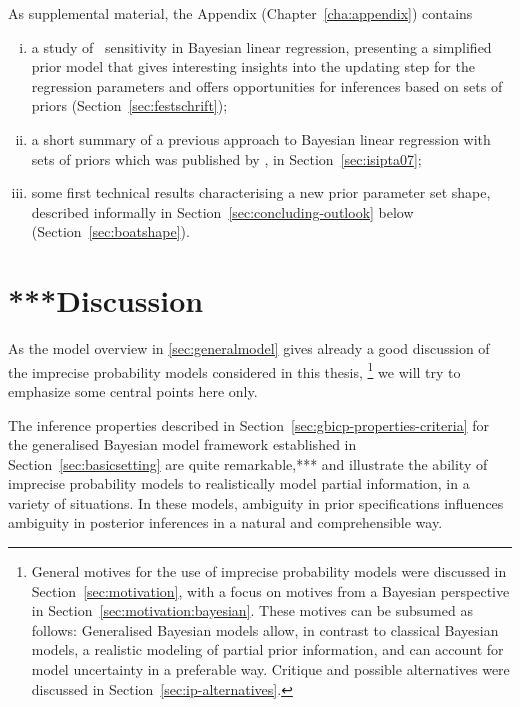 As supplemental material, the Appendix (Chapter~\ref{cha:appendix}) contains
\begin{enumerate}[(i)]
\item a study of \pdc\ sensitivity in Bayesian linear regression,
presenting a simplified prior model that gives interesting insights into the updating step
for the regression parameters and offers opportunities for inferences based on sets of priors
(Section~\ref{sec:festschrift});
\item a short summary of a previous approach to Bayesian linear regression
with sets of priors which was published by \textcite{Walter2007a}, in Section~\ref{sec:isipta07};
\item some first technical results characterising a new prior parameter set shape,
described informally in Section~\ref{sec:concluding-outlook} below
(Section~\ref{sec:boatshape}).
\end{enumerate}


\section{***Discussion}
\label{sec:concluding-discussion}


As the model overview in \ref{sec:generalmodel} gives already a good discussion
of the imprecise probability models considered in this thesis,%
\footnote{General motives for the use of imprecise probability models
were discussed in Section~\ref{sec:motivation},
with a focus on motives from a Bayesian perspective in Section~\ref{sec:motivation:bayesian}.
These motives can be subsumed as follows:
Generalised Bayesian models allow, in contrast to classical Bayesian models,
a realistic modeling of partial prior information,
and can account for model uncertainty in a preferable way.
Critique and possible alternatives were discussed in Section~\ref{sec:ip-alternatives}.}
we will try to emphasize some central points here only.

The inference properties described in Section~\ref{sec:gbicp-properties-criteria}
for the generalised Bayesian model framework established in Section~\ref{sec:basicsetting}
are quite remarkable,***
and illustrate the ability of imprecise probability models to realistically model partial information,
in a variety of situations.
In these models, ambiguity in prior specifications influences ambiguity in posterior inferences
in a natural and comprehensible way.

